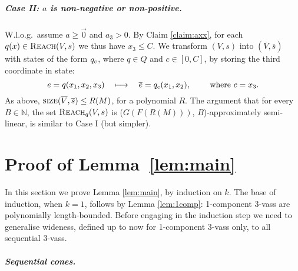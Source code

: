 \documentclass[a4paper, UKenglish, cleveref, autoref, thm-restate]{lipics-v2021}
\newcommand{\N}{\mathbb{N}}
\newcommand{\reach}{\textsc{Reach}}
\newcommand{\size}{\textsc{size}}
\renewcommand{\vec}[1]{\overrightarrow{#1}}
\newcommand{\kanapka}[2]{(#1, #2)-approximately semi-linear}
\newcommand{\plb}{polynomially length-bounded\xspace}
\newcommand{\vass}{{\sc vass}\xspace}
\newcommand{\tvass}{\parvass 3}
\newcommand{\parvass}[1]{{$#1$-\vass}\xspace}
\newcommand{\para}[1]{\vspace{-3mm}\subparagraph*{\bf #1.}}
\newcommand{\setfromto}[2]{[#1, #2]}
\newcommand{\Wlog}{W.l.o.g.~}
\newcommand{\essdvass}[1]{\overline{#1}}
\begin{document}
\begin{appendixproof}
\para{Case II: $a$ is non-negative or non-positive}
\Wlog assume $a\geq \vec 0$ and $a_3 > 0$.
By Claim \ref{claim:axx}, for each $q(x) \in \reach(V,s)$
we thus have $x_3 \leq C$.
We transform $(V,s)$ into $(\essdvass V, \essdvass s)$ 
with states of the form $q_{c}$, where $q\in Q$ and $c\in\setfromto {0} C$, 
by storing the third coordinate in state:
\[
e = q(x_1, x_2, x_3) \quad \longmapsto \quad
\essdvass e = \pair q c(x_1, x_2), 
\qquad
\text{ where } c = x_3.
\]
As above, $\size(\essdvass V, \essdvass s) \leq R(M)$, for a polynomial $R$.
The argument  that for every $B\in\N$,
the set $\reach_{q}(V,s)$ is \kanapka {$G(F(R(M)))$} {$B$}, is similar to Case I (but simpler).
\end{appendixproof}

 


\section{Proof of Lemma~\ref{lem:main}}\label{sec:mainproof}


In this section we prove Lemma \ref{lem:main}, 
by induction on $k$.
The base of induction, when $k=1$, follows by Lemma \ref{lem:1comp}:
 1-component \tvass are \plb. Before engaging in the induction step
we need to generalise wideness, defined up to now for 1-component \tvass only,
to all sequential \tvass.


\para{Sequential cones}
\end{document}
